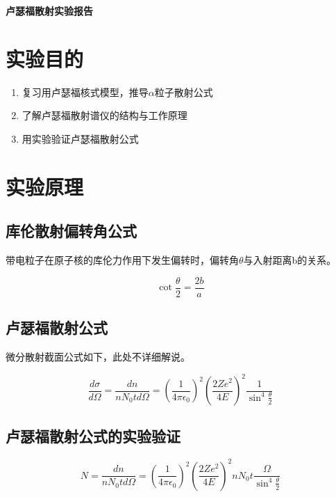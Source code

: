 \documentclass[a4paper,UTF8]{ctexart}
\begin{document}
\begin{center}
    \textbf{\Large 卢瑟福散射实验报告}
    \par {}
\end{center}

\section{实验目的}

\begin{enumerate}
    \item 复习用卢瑟福核式模型，推导$\alpha$粒子散射公式
    \item 了解卢瑟福散射谱仪的结构与工作原理
    \item 用实验验证卢瑟福散射公式
\end{enumerate}

\section{实验原理}

\subsection{库伦散射偏转角公式}

带电粒子在原子核的库伦力作用下发生偏转时，偏转角$\theta$与入射距离b的关系。

\begin{equation}
    \cot{\frac{\theta}{2}} = \frac{2b}{a}
\end{equation}

\subsection{卢瑟福散射公式}

微分散射截面公式如下，此处不详细解说。

\begin{equation}
    \frac{d \sigma}{d \Omega} = \frac{dn}{nN_{0}td\Omega} = (\frac{1}{4\pi \epsilon_{0}})^2 (\frac{2Ze^2}{4E})^2 \frac{1}{\sin^4{\frac{\theta}{2}}}
\end{equation}

\subsection{卢瑟福散射公式的实验验证}

\begin{equation}
    N = \frac{dn}{nN_{0}td\Omega} = (\frac{1}{4\pi \epsilon_{0}})^2 (\frac{2Ze^2}{4E})^2 nN_0t \frac{\Omega}{\sin^4{\frac{\theta}{2}}}
\end{equation}
\end{document}
